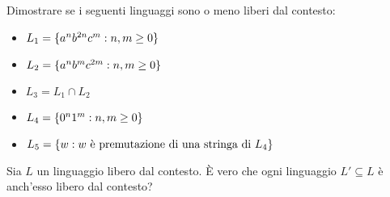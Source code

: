 \documentclass[runningheads,a4paper]{llncs}
\begin{document}
\begin{example}
Dimostrare se i seguenti linguaggi sono o meno liberi dal contesto:
\begin{itemize}
\item $L_1 = \{a^nb^{2n}c^m : n,m \geq 0\}$
\item $L_2 = \{a^nb^{m}c^{2m} : n,m \geq 0\}$
\item $L_3 = L_1 \cap L_2$
\item $L_4 = \{0^n1^m : n,m \geq 0\}$
\item $L_5 = \{w : w \mbox{ \`{e} premutazione di una stringa di } L_4\}$
\end{itemize}
\end{example}

\begin{example}
Sia $L$ un linguaggio libero dal contesto. \`{E} vero che ogni linguaggio $L' \subseteq L$ \`{e} anch'esso libero dal contesto?
\end{example}


\end{document}
